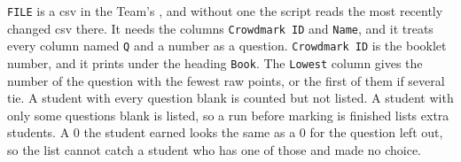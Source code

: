 \texttt{FILE} is a csv in the Team's , and without one the script reads the most recently changed csv there.
It needs the columns \texttt{Crowdmark ID} and \texttt{Name}, and it treats every column named \texttt{Q} and a number as a question.
\texttt{Crowdmark ID} is the booklet number, and it prints under the heading \texttt{Book}.
The \texttt{Lowest} column gives the number of the question with the fewest raw points, or the first of them if several tie.
A student with every question blank is counted but not listed.
A student with only some questions blank is listed, so a run before marking is finished lists extra students.
A 0 the student earned looks the same as a 0 for the question left out, so the list cannot catch a student who has one of those and made no choice.
